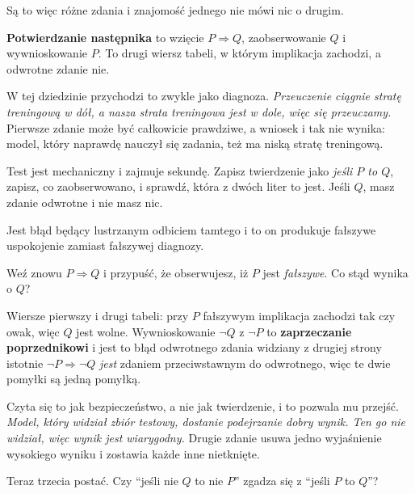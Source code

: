 \begin{fr}
Są to więc różne zdania i znajomość jednego nie mówi nic o drugim.

\begin{trapbox}
\textbf{Potwierdzanie następnika} to wzięcie $P \Rightarrow Q$,
zaobserwowanie $Q$ i wywnioskowanie $P$. To drugi wiersz tabeli, w którym
implikacja zachodzi, a odwrotne zdanie nie.

W tej dziedzinie przychodzi to zwykle jako diagnoza. \emph{Przeuczenie ciągnie
stratę treningową w dół, a nasza strata treningowa jest w dole, więc się
przeuczamy.} Pierwsze zdanie może być całkowicie prawdziwe, a wniosek i tak
nie wynika: model, który naprawdę nauczył się zadania, też ma niską stratę
treningową.

Test jest mechaniczny i zajmuje sekundę. Zapisz twierdzenie jako \emph{jeśli
$P$ to $Q$}, zapisz, co zaobserwowano, i sprawdź, która z dwóch liter to
jest. Jeśli $Q$, masz zdanie odwrotne i nie masz nic.
\end{trapbox}

Jest błąd będący lustrzanym odbiciem tamtego i to on produkuje fałszywe
uspokojenie zamiast fałszywej diagnozy.

Weź znowu $P \Rightarrow Q$ i przypuść, że obserwujesz, iż $P$ jest
\emph{fałszywe}. Co stąd wynika o $Q$?
\nextframe
\end{fr}

\begin{fr}
Wiersze pierwszy i drugi tabeli: przy $P$ fałszywym implikacja zachodzi tak
czy owak, więc $Q$ jest wolne. Wywnioskowanie $\lnot Q$ z $\lnot P$ to
\textbf{zaprzeczanie poprzednikowi} i jest to błąd odwrotnego zdania widziany
z drugiej strony \dash{} istotnie $\lnot P \Rightarrow \lnot Q$ \emph{jest}
zdaniem przeciwstawnym do odwrotnego, więc te dwie pomyłki są jedną pomyłką.

Czyta się to jak bezpieczeństwo, a nie jak twierdzenie, i to pozwala mu
przejść. \emph{Model, który widział zbiór testowy, dostanie podejrzanie dobry
wynik. Ten go nie widział, więc wynik jest wiarygodny.} Drugie zdanie usuwa
jedno wyjaśnienie wysokiego wyniku i zostawia każde inne nietknięte.

Teraz trzecia postać. Czy \enquote{jeśli nie $Q$ to nie $P$} zgadza się z
\enquote{jeśli $P$ to $Q$}?
\dotline
\nextframe
\end{fr}

